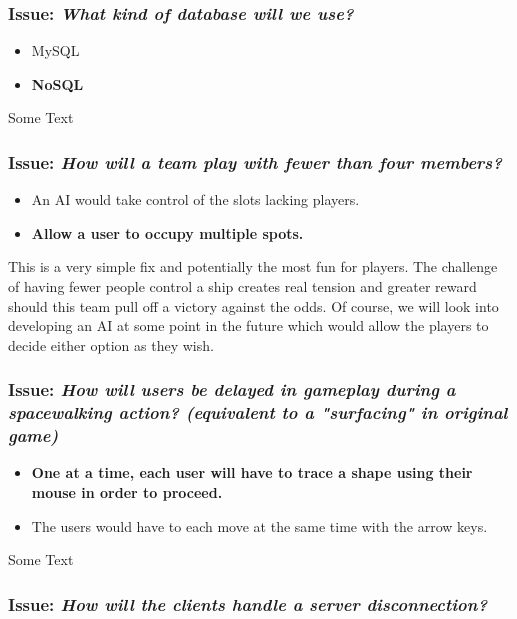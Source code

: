 \subsubsection*{Issue: \textit{What kind of database will we use?}}

  \begin{itemize}
    \item MySQL
    \item \textbf{NoSQL}
  \end{itemize}

Some Text

\subsubsection*{Issue: \textit{How will a team play with fewer than four members?}}

  \begin{itemize}
    \item An AI would take control of the slots lacking players.
    \item \textbf{Allow a user to occupy multiple spots.}
  \end{itemize}

This is a very simple fix and potentially the most fun for players. The challenge of having fewer people control a ship creates real tension and greater reward should this team pull off a victory against the odds. Of course, we will look into developing an AI at some point in the future which would allow the players to decide either option as they wish.

\subsubsection*{Issue: \textit{How will users be delayed in gameplay during a spacewalking action? (equivalent to a "surfacing" in original game)}}

  \begin{itemize}
    \item \textbf{One at a time, each user will have to trace a shape using their mouse in order to proceed.}
    \item The users would have to each move at the same time with the arrow keys.
  \end{itemize}

Some Text

\subsubsection*{Issue: \textit{How will the clients handle a server disconnection?}}

